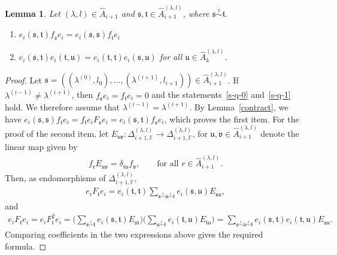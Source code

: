 \documentclass[11pt,a4paper,reqno,svgnames]{amsart}
\theoremstyle{plain}
\newtheorem{lemma}[theorem]{Lemma}
\theoremstyle{definition}
\numberwithin{equation}{section}
\begin{document}
\begin{lemma}\label{s-q}
Let $(\lambda,{l})\in\hat{A}_{i+1}$ and $\mathfrak{s},\mathfrak{t}\in\hat{A}_{i+1}^{(\lambda,l)}$, where $\mathfrak{s}\stackrel{i}{\sim}\mathfrak{t}$.
\begin{enumerate}[label=(\arabic{*}), ref=\arabic{*},leftmargin=0pt,itemindent=1.5em]
\item\label{s-q-0} $e_{i}(\mathfrak{s},\mathfrak{t}) f_\mathfrak{s}e_{i}=e_i(\mathfrak{s},\mathfrak{s}) f_\mathfrak{t}e_i$
\item\label{s-q-1}  $e_{i}(\mathfrak{s},\mathfrak{t})e_{i}(\mathfrak{t},\mathfrak{u})
=e_{i}(\mathfrak{t},\mathfrak{t})e_{i}(\mathfrak{s},\mathfrak{u})$ for all $\mathfrak{u}\in\hat{A}_{k}^{(\lambda,{l})}$.
\end{enumerate}
\end{lemma}
\begin{proof}
Let $\mathfrak{s}=((\lambda^{(0)},l_0),\ldots,(\lambda^{(i+1)},l_{i+1}))\in\hat{A}_{i+1}^{(\lambda,{l})}$. If $\lambda^{(i-1)}\ne\lambda^{(i+1)}$, then $f_\mathfrak{s}e_i=f_\mathfrak{t}e_i=0$ and 
 the statements~\eqref{s-q-0} and~\eqref{s-q-1} hold. We therefore assume that $\lambda^{(i-1)}=\lambda^{(i+1)}$.  By Lemma~\ref{contract}, we have $e_i(\mathfrak{s},\mathfrak{s})f_\mathfrak{t}e_i=f_\mathfrak{t}e_i F_\mathfrak{s}e_i=e_i(\mathfrak{s},\mathfrak{t})f_\mathfrak{s}e_i$, which proves the first item. For the proof of the second item, let $E_\mathfrak{uv}:\Delta_{i+1,\mathbb{F}}^{(\lambda,l)}\to \Delta_{i+1,\mathbb{F}}^{(\lambda,l)}$, for $\mathfrak{u,v}\in\hat{A}_{i+1}^{(\lambda,l)}$ denote the linear map given by
\begin{align*}
f_\mathfrak{r}E_\mathfrak{uv}= \delta_\mathfrak{ru}f_\mathfrak{v},\qquad\text{for all $r\in\hat{A}_{i+1}^{(\lambda,l)}$.}
\end{align*}
Then, as endomorphisms of $\Delta_{i+1,\mathbb{F}}^{(\lambda,l)}$, 
\begin{align*}
e_iF_\mathfrak{t}e_i= e_i(\mathfrak{t},\mathfrak{t})\sum_{\mathfrak{s}\stackrel{i}{\sim}\mathfrak{u}\stackrel{i}{\sim}\mathfrak{t}} e_i(\mathfrak{s},\mathfrak{u})E_\mathfrak{su},
\end{align*}
and 
\begin{align*}
e_iF_\mathfrak{t}e_i= e_iF_\mathfrak{t}^2e_i= \bigg( \sum_{\mathfrak{s}\stackrel{i}{\sim}\mathfrak{t}} e_i(\mathfrak{s,t})E_\mathfrak{st}\bigg) \bigg( \sum_{\mathfrak{u}\stackrel{i}{\sim}\mathfrak{t}} e_i(\mathfrak{t,u})E_\mathfrak{tu}\bigg) = \sum_{\mathfrak{s}\stackrel{i}{\sim}\mathfrak{u}\stackrel{i}{\sim}\mathfrak{t}} e_i(\mathfrak{s},\mathfrak{t})e_i(\mathfrak{t,u})E_\mathfrak{su}.
\end{align*}
Comparing coefficients in the two expressions above gives the required formula.
\end{proof}
\end{document}
